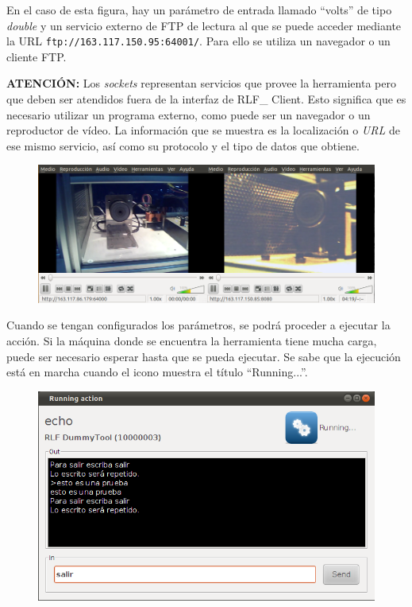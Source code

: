 En el caso de esta figura, hay un parámetro de entrada llamado 
``volts'' de tipo \emph{double} y un servicio externo de FTP de 
lectura al que se puede acceder mediante la URL 
\texttt{ftp://163.117.150.95:64001/}. Para ello se utiliza un 
navegador o un cliente FTP.

\textbf{ATENCIÓN:} Los \emph{sockets} representan servicios que provee 
la herramienta pero que deben ser atendidos fuera de la interfaz de 
RLF\_ Client. Esto significa que es necesario utilizar un programa 
externo, como puede ser un navegador o un reproductor de vídeo. La 
información que se muestra es la localización o \emph{URL} de ese 
mismo servicio, así como su protocolo y el tipo de datos que obtiene.

\begin{figure}[h]
	\centering
	\includegraphics[scale=0.4]{images/user/video.png}
\end{figure}

Cuando se tengan configurados los parámetros, se podrá proceder a 
ejecutar la acción. Si la máquina donde se encuentra la herramienta 
tiene mucha carga, puede ser necesario esperar hasta que se pueda 
ejecutar. Se sabe que la ejecución está en marcha cuando el icono 
muestra el título ``Running...''.

\begin{figure}[h]
	\centering
	\includegraphics[scale=0.6]{images/user/running.png}
\end{figure}

